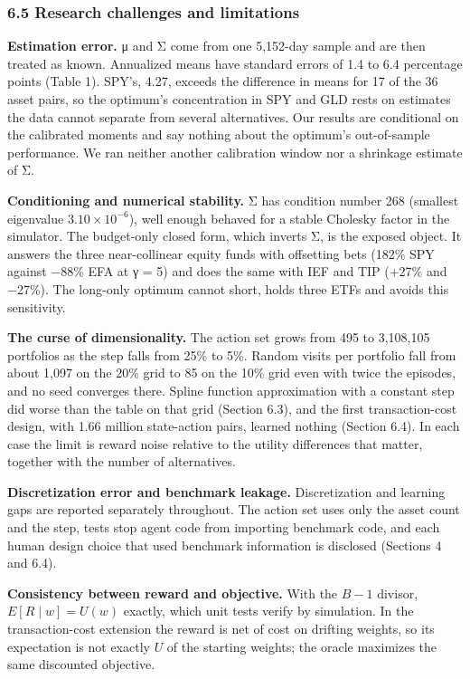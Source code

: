 \documentclass[
  11pt]{article}
\begin{document}
\subsubsection{6.5 Research challenges and
limitations}\label{research-challenges-and-limitations}

\textbf{Estimation error.} μ and Σ come from one 5,152-day sample and
are then treated as known. Annualized means have standard errors of 1.4
to 6.4 percentage points (Table 1). SPY's, 4.27, exceeds the difference
in means for 17 of the 36 asset pairs, so the optimum's concentration in
SPY and GLD rests on estimates the data cannot separate from several
alternatives. Our results are conditional on the calibrated moments and
say nothing about the optimum's out-of-sample performance. We ran
neither another calibration window nor a shrinkage estimate of Σ.

\textbf{Conditioning and numerical stability.} Σ has condition number
268 (smallest eigenvalue \(3.10 \times 10^{-6}\)), well enough behaved
for a stable Cholesky factor in the simulator. The budget-only closed
form, which inverts Σ, is the exposed object. It answers the three
near-collinear equity funds with offsetting bets (182\% SPY against
−88\% EFA at γ = 5) and does the same with IEF and TIP (+27\% and
−27\%). The long-only optimum cannot short, holds three ETFs and avoids
this sensitivity.

\textbf{The curse of dimensionality.} The action set grows from 495 to
3,108,105 portfolios as the step falls from 25\% to 5\%. Random visits
per portfolio fall from about 1,097 on the 20\% grid to 85 on the 10\%
grid even with twice the episodes, and no seed converges there. Spline
function approximation with a constant step did worse than the table on
that grid (Section 6.3), and the first transaction-cost design, with
1.66 million state-action pairs, learned nothing (Section 6.4). In each
case the limit is reward noise relative to the utility differences that
matter, together with the number of alternatives.

\textbf{Discretization error and benchmark leakage.} Discretization and
learning gaps are reported separately throughout. The action set uses
only the asset count and the step, tests stop agent code from importing
benchmark code, and each human design choice that used benchmark
information is disclosed (Sections 4 and 6.4).

\textbf{Consistency between reward and objective.} With the \(B-1\)
divisor, \(E[R \mid w] = U(w)\) exactly, which unit tests verify by
simulation. In the transaction-cost extension the reward is net of cost
on drifting weights, so its expectation is not exactly \(U\) of the
starting weights; the oracle maximizes the same discounted objective.
\end{document}
